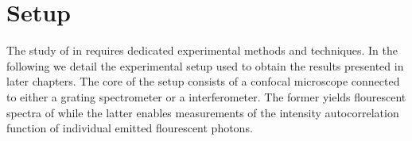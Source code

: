 
\chapter{\Pl Setup}	\label{ch::pl_setup}

	The study of \sivs in \nds requires dedicated experimental methods and techniques. In the following we detail the experimental setup used to obtain the results presented in later chapters. The core of the setup consists of a confocal microscope connected to either a grating spectrometer or a \HBT interferometer. The former yields flourescent spectra of \sivs while the latter enables measurements of the intensity autocorrelation function of individual emitted flourescent photons.








